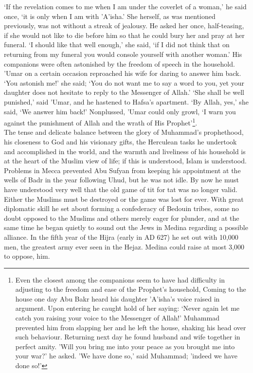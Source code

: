 \documentclass[10pt, twoside,openright]{book}
\begin{document}
`If the revelation comes to me when I am under the coverlet of a woman,' he said once, `it is only 
when I am with 'A'isha.' She herself, as was mentioned previously, was not without a streak of 
jealousy. He asked her once, half-teasing, if she would not like to die before him so that he could 
bury her and pray at her funeral. `I should like that well enough,' she said, `if I did not think 
that on returning from my funeral you would console yourself with another woman.' His companions were 
often astonished by the freedom of speech in the household. 'Umar on a certain occasion reproached 
his wife for daring to answer him back. `You astonish me!' she said; `You do not want me to say a 
word to you, yet your daughter does not hesitate to reply to the Messenger of Allah.' `She shall be 
well punished,' said 'Umar, and he hastened to Hafsa's apartment. `By Allah, yes,' she said, `We 
answer him back!' Nonplussed, 'Umar could only growl, `I warn you against the punishment of Allah and 
the wrath of His Prophet'\footnote{Even the closest among the companions seem to have had difficulty in adjusting to the freedom and ease of the Prophet's household, Coming to the house one day Abu Bakr heard his daughter 'A'isha's voice raised in argument. Upon entering he caught hold of her saying: `Never again let me catch you raising your voice to the Messenger of Allah!' Muhammad prevented him from slapping her and he left the house, shaking his head over such behaviour. Returning next day he found husband and wife together in perfect amity. 'Will you bring me into your peace as you brought me into your war?' he asked. 'We have done so,' said Muhammad; 'indeed we have done so!' }.\\

The tense and delicate balance between the glory of Muhammad's prophethood, his closeness to God and 
his visionary gifts, the Herculean tasks he undertook and accomplished in the world, and the warmth 
and liveliness of his household is at the heart of the Muslim view of life; if this is understood, 
Islam is understood. \\

Problems in Mecca prevented Abu Sufyan from keeping his appointment at the wells of Badr in the year 
following Uhud, but he was not idle. By now he must have understood very well that the old game of 
tit for tat was no longer valid. Either the Muslims must be destroyed or the game was lost for ever. 
With great diplomatic skill he set about forming a confederacy of Bedouin tribes, some no doubt 
opposed to the Muslims and others merely eager for plunder, and at the same time he began quietly to 
sound out the Jews in Medina regarding a possible alliance. In the fifth year of the Hijra (early in 
AD 627) he set out with 10,000 men, the greatest army ever seen in the Hejaz. Medina could raise at 
most 3,000 to oppose, him. \\
\end{document}
